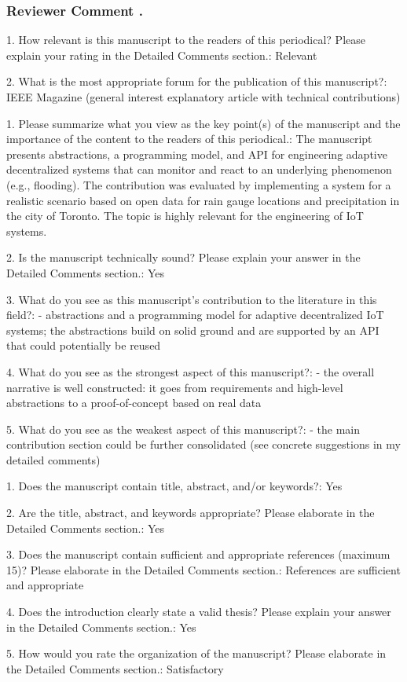 \documentclass{article}
\newcounter{reviewer}
\newcounter{comment}[reviewer]
\newcommand{\commentl}[2]{
	\subsubsection*{\refstepcounter{comment}\label{#1}Reviewer Comment \arabic{reviewer}.\arabic{comment}} %
	\colorbox{gray!10}{\parbox[t]{\linewidth}{ #2 }}
}
\begin{document}
\commentl{r1-responses}{
	1. How relevant is this manuscript to the readers of this periodical? Please explain your rating in the Detailed Comments section.: Relevant

	2. What is the most appropriate forum for the publication of this manuscript?: IEEE Magazine (general interest explanatory article with technical contributions)
	
	1. Please summarize what you view as the key point(s) of the manuscript and the importance of the content to the readers of this periodical.: The manuscript presents abstractions, a programming model, and API for engineering adaptive decentralized systems that can monitor and react to an underlying phenomenon (e.g., flooding). The contribution was evaluated by implementing a system for a realistic scenario based on open data for rain gauge locations and precipitation in the city of Toronto. The topic is highly relevant for the engineering of IoT systems.
	
	2. Is the manuscript technically sound? Please explain your answer in the Detailed Comments section.: Yes
	
	3. What do you see as this manuscript's contribution to the literature in this field?: - abstractions and a programming model for adaptive decentralized IoT systems; the abstractions build on solid ground and are supported by an API that could potentially be reused
	
	4. What do you see as the strongest aspect of this manuscript?: - the overall narrative is well constructed: it goes from requirements and high-level abstractions to a proof-of-concept based on real data
	
	5. What do you see as the weakest aspect of this manuscript?: - the main contribution section could be further consolidated (see concrete suggestions in my detailed comments)
	
	1. Does the manuscript contain title, abstract, and/or keywords?: Yes
	
	2. Are the title, abstract, and keywords appropriate? Please elaborate in the Detailed Comments section.: Yes
	
	3. Does the manuscript contain sufficient and appropriate references (maximum 15)? Please elaborate in the Detailed Comments section.: References are sufficient and appropriate
	
	4. Does the introduction clearly state a valid thesis? Please explain your answer in the Detailed Comments section.: Yes
	
	5. How would you rate the organization of the manuscript? Please elaborate in the Detailed Comments section.: Satisfactory
	
}
\end{document}
